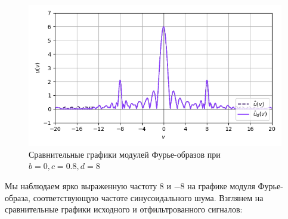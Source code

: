 \documentclass[a4paper]{article}
\begin{document}
\begin{figure}[H]
\begin{minipage}{0.33\textwidth}
        \centering \includegraphics[width=\textwidth]{sources/band-stop filter/fourier (b=0, c=0.8, d=8, v=16).png}
        \caption{$v = 16$}
    \end{minipage}
    \caption*{Сравнительные графики модулей Фурье-образов при $b=0, c=0.8, d=8$}
\end{figure}
Мы наблюдаем ярко выраженную частоту $8$ и $-8$ на графике модуля Фурье-образа, соответствующую частоте синусоидального шума. Взглянем на сравнительные графики исходного и отфильтрованного сигналов:
\end{document}
